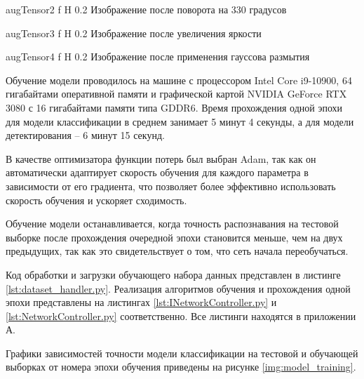 {augTensor2} %
{f} %
{H} %
{0.2\textwidth} %
{Изображение после поворота на 330 градусов} %

{augTensor3} %
{f} %
{H} %
{0.2\textwidth} %
{Изображение после увеличения яркости} %

{augTensor4} %
{f} %
{H} %
{0.2\textwidth} %
{Изображение после применения гауссова размытия} %

Обучение модели проводилось на машине с процессором Intel Core i9-10900, 64 гигабайтами оперативной памяти и графической картой NVIDIA GeForce RTX 3080 с 16 гигабайтами памяти типа GDDR6. Время прохождения одной эпохи для модели классификации в среднем занимает 5 минут 4 секунды, а для модели детектирования -- 6 минут 15 секунд.

В качестве оптимизатора функции потерь был выбран Adam, так как он автоматически адаптирует скорость обучения для каждого параметра в зависимости от его градиента, что позволяет более эффективно использовать скорость обучения и ускоряет сходимость.

Обучение модели останавливается, когда точность распознавания на тестовой выборке после прохождения очередной эпохи становится меньше, чем на двух предыдущих, так как это свидетельствует о том, что сеть начала переобучаться.

Код обработки и загрузки обучающего набора данных представлен в листинге \ref{lst:dataset_handler.py}. Реализация алгоритмов обучения и прохождения одной эпохи представлены на листингах \ref{lst:INetworkController.py} и \ref{lst:NetworkController.py} соответственно. Все листинги находятся в приложении А.

Графики зависимостей точности модели классификации на тестовой и обучающей выборках от номера эпохи обучения приведены на рисунке \ref{img:model_training}.

